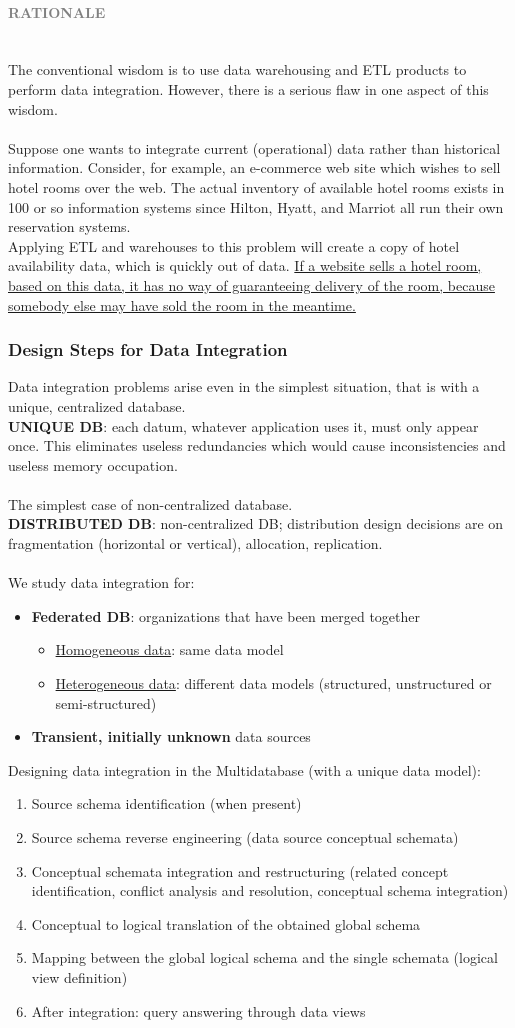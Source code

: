 \documentclass[10pt,a4paper]{article}
\newcommand{\nline}{\\~\\}
\newcommand{\myparagraph}[1]{\paragraph{\normalsize{\textcolor{gray}{\uppercase{\textbf{#1}}}} }\mbox{} \vspace{0.5em}\\}
\begin{document}
\myparagraph{Rationale}
The conventional wisdom is to use data warehousing and ETL products to perform data integration. However, there is a serious flaw in one aspect of this wisdom. \nline
Suppose one wants to integrate current (operational) data rather than historical information. Consider, for example, an e-commerce web site which wishes to sell hotel rooms over the web. The actual inventory of available hotel rooms exists in 100 or so information systems since Hilton, Hyatt, and Marriot all run their own reservation systems.\\ Applying ETL and warehouses to this problem will create a copy of hotel availability data, which is quickly out of data. \uline{If a website sells a hotel room, based on this data, it has no way of guaranteeing delivery of the room, because somebody else may have sold the room in the meantime.}
\subsubsection{Design Steps for Data Integration}
Data integration problems arise even in the simplest situation, that is with a unique, centralized database. \\
\textbf{UNIQUE DB}: each datum, whatever application uses it, must only appear once. This eliminates useless redundancies which would cause inconsistencies and useless memory occupation. \nline
The simplest case of non-centralized database.\\
\textbf{DISTRIBUTED DB}: non-centralized DB; distribution design decisions are on fragmentation (horizontal or vertical), allocation, replication. \nline
We study data integration for:
\begin{itemize}
	\item \textbf{Federated DB}: organizations that have been merged together
	\begin{itemize}
		\item \uline{Homogeneous data}: same data model
		\item \uline{Heterogeneous data}: different data models (structured, unstructured or semi-structured)
	\end{itemize}
	\item \textbf{Transient, initially unknown} data sources
\end{itemize}
Designing data integration in the Multidatabase (with a unique data model):
\begin{enumerate}
	\item Source schema identification (when present)
	\item Source schema reverse engineering (data source conceptual schemata)
	\item Conceptual schemata integration and restructuring (related concept identification, conflict analysis and resolution, conceptual schema integration)
	\item Conceptual to logical translation of the obtained global schema
	\item Mapping between the global logical schema and the single schemata (logical view definition)
	\item After integration: query answering through data views
\end{enumerate}
\end{document}
